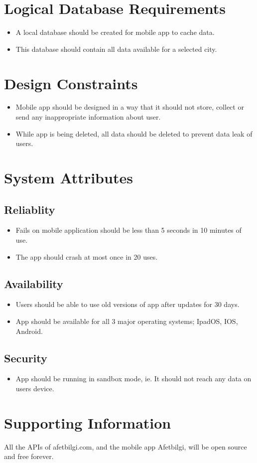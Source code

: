 \section{Logical Database Requirements}
\begin{itemize}
    \item A local database should be created for mobile app to cache data.
    \item This database should contain all data available for a selected city.
\end{itemize}
\section{Design Constraints}
\begin{itemize}
    \item Mobile app should be designed in a way that it should not store, collect or send any inappropriate information about user.
    \item While app is being deleted, all data should be deleted to prevent data leak of users.
\end{itemize}
\section{System Attributes}
\subsection{Reliablity}
\begin{itemize}
    \item Fails on mobile application should be less than 5 seconds in 10 minutes of use.
    \item The app should crash at most once in 20 uses.
\end{itemize}

\subsection{Availability}
\begin{itemize}
    \item Users should be able to use old versions of app after updates for 30 days.
    \item App should be available for all 3 major operating systems; IpadOS, IOS, Android.
\end{itemize}

\subsection{Security}
\begin{itemize}
    \item App should be running in sandbox mode, ie. It should not reach any data on users device.
\end{itemize}

\section{Supporting Information}
All the APIs of afetbilgi.com, and the mobile app Afetbilgi, will be open source and free forever.